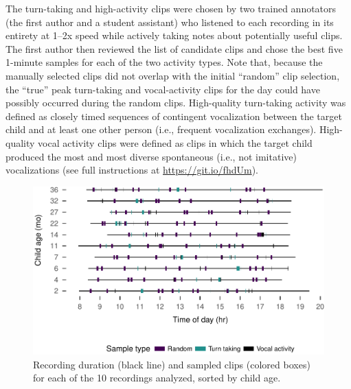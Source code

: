 \documentclass[floatsintext,man]{apa6}
\theoremstyle{definition}
\theoremstyle{definition}
\theoremstyle{definition}
\theoremstyle{remark}
\begin{document}
The turn-taking and high-activity clips were chosen by two trained
annotators (the first author and a student assistant) who listened to
each recording in its entirety at 1--2x speed while actively taking
notes about potentially useful clips. The first author then reviewed the
list of candidate clips and chose the best five 1-minute samples for
each of the two activity types. Note that, because the manually selected
clips did not overlap with the initial \enquote{random} clip selection,
the \enquote{true} peak turn-taking and vocal-activity clips for the day
could have possibly occurred during the random clips. High-quality
turn-taking activity was defined as closely timed sequences of
contingent vocalization between the target child and at least one other
person (i.e., frequent vocalization exchanges). High-quality vocal
activity clips were defined as clips in which the target child produced
the most and most diverse spontaneous (i.e., not imitative)
vocalizations (see full instructions at \url{https://git.io/fhdUm}).

\begin{figure}
\centering
\includegraphics{Tseltal-CLE_files/figure-latex/fig2-1.pdf}
\caption{\label{fig:fig2}Recording duration (black line) and sampled clips
(colored boxes) for each of the 10 recordings analyzed, sorted by child
age.}
\end{figure}
\end{document}
